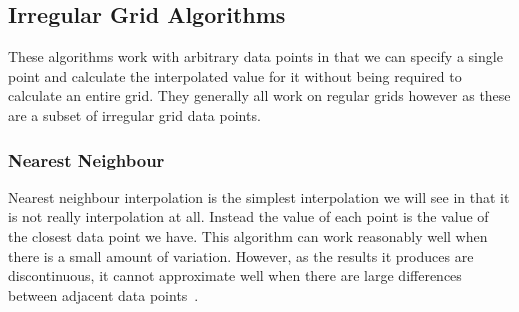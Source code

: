     \subsection{Irregular Grid Algorithms}\label{background_interpolation_methods_irregular_grid}

        These algorithms work with arbitrary data points in that we can specify a single point and calculate the interpolated value for it without being required to calculate an entire grid. They generally all work on regular grids however as these are a subset of irregular grid data points. 

        \subsubsection{Nearest Neighbour}\label{background_interpolation_methods_nearest_neighbour}

            Nearest neighbour interpolation is the simplest interpolation we will see in that it is not really interpolation at all. Instead the value of each point is the value of the closest data point we have. This algorithm can work reasonably well when there is a small amount of variation. However, as the results it produces are discontinuous, it cannot approximate well when there are large differences between adjacent data points~\cite{imageresamplingcomparison}.

